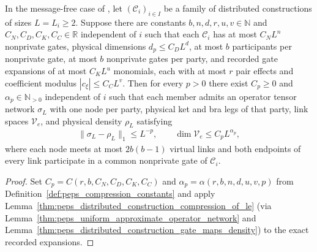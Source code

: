 \begin{lemma}
    \label{thm:peps_distributed_construction_compression}
    \leanok
    In the message-free case of \cite[Theorem~5.2]{OpenAI2026PolynomialPEPS},
    let $(\mathcal C_i)_{i\in I}$ be a family of distributed constructions of
    sizes $L=L_i\ge2$. Suppose there are constants
    $b,n,d,r,u,v\in\mathbb N$ and $C_N,C_D,C_K,C_C\in\mathbb R$ independent of
    $i$ such that each $\mathcal C_i$ has at most $C_NL^n$ nonprivate gates,
    physical dimensions $d_p\le C_DL^d$, at most $b$ participants per
    nonprivate gate, at most $b$ nonprivate gates per party, and recorded gate
    expansions of at most $C_KL^u$ monomials, each with at most $r$ pair effects
    and coefficient modulus $|c_\xi|\le C_CL^v$. Then for every $p>0$ there
    exist $C_p\ge0$ and $\alpha_p\in\mathbb N_{>0}$ independent of $i$ such that
    each member admits an operator tensor network $\sigma_L$ with one node per
    party, physical ket and bra legs of that party, link spaces $\mathcal V_e$,
    and physical density $\rho_L$ satisfying
    \begin{align}
        \|\sigma_L-\rho_L\|_1\le L^{-p},\qquad \dim\mathcal V_e\le C_pL^{\alpha_p},
        \label{eq:peps_distributed_construction_compression}
    \end{align}
    where each node meets at most $2b(b-1)$ virtual links and both endpoints of
    every link participate in a common nonprivate gate of $\mathcal C_i$.
\end{lemma}
\begin{proof}
    \leanok
    Set $C_p=C(r,b,C_N,C_D,C_K,C_C)$ and $\alpha_p=\alpha(r,b,n,d,u,v,p)$ from
    Definition~\ref{def:peps_compression_constants} and apply
    Lemma~\ref{thm:peps_distributed_construction_compression_of_le}
    (via Lemma~\ref{thm:peps_uniform_approximate_operator_network} and
    Lemma~\ref{thm:peps_distributed_construction_gate_maps_density}) to the
    exact recorded expansions.
\end{proof}

